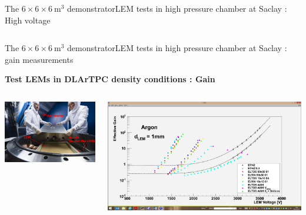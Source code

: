 \documentclass[10pt]{beamer}
\begin{document}
\begin{frame}{The \texorpdfstring{$6 \times 6 \times \SI{6}{\meter\cubed}$}{666} demonstrator}{LEM tests in high pressure chamber at Saclay : High voltage}
\begin{scriptsize}
\begin{columns}
\begin{column}{0.48\textwidth}
\begin{minipage}{0.48\textwidth}
	    			\end{minipage}
	    		\end{column}
	    	\end{columns}
    	\end{scriptsize} 
    \end{frame}
    
    \begin{frame}{The \texorpdfstring{$6 \times 6 \times \SI{6}{\meter\cubed}$}{666} demonstrator}{LEM tests in high pressure chamber at Saclay : gain measurements}
    	\begin{scriptsize}
    		\begin{center}\textbf{Test LEMs in DLArTPC density conditions : Gain}\end{center}
    		\begin{columns}
    			\begin{column}{0.42\textwidth}
    				\centering \includegraphics[width=\textwidth]{figures/666/gamelle_source.png}
    			\end{column}\hfill
    			\begin{column}{0.58\textwidth}
    				\centering \includegraphics[width=\textwidth]{figures/666/gain.png}

\end{column}
\end{columns}
\end{scriptsize}
\end{frame}
\end{document}
